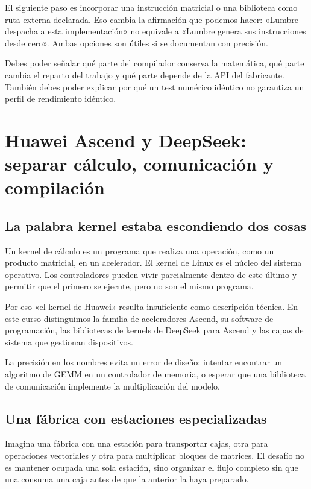 \documentclass[12pt,a4paper,oneside]{report}
\begin{document}
El siguiente paso es incorporar una instrucción matricial o una biblioteca como ruta externa declarada. Eso cambia la afirmación que podemos hacer: «Lumbre despacha a esta implementación» no equivale a «Lumbre genera sus instrucciones desde cero». Ambas opciones son útiles si se documentan con precisión.

\begin{comprueba}
Debes poder señalar qué parte del compilador conserva la matemática, qué parte cambia el reparto del trabajo y qué parte depende de la API del fabricante. También debes poder explicar por qué un test numérico idéntico no garantiza un perfil de rendimiento idéntico.

\end{comprueba}
\chapter{Huawei Ascend y DeepSeek: separar cálculo, comunicación y compilación}
\label{ch:ascend}
\section{La palabra kernel estaba escondiendo dos cosas}
Un kernel de cálculo es un programa que realiza una operación, como un producto matricial, en un acelerador. El kernel de Linux es el núcleo del sistema operativo. Los controladores pueden vivir parcialmente dentro de este último y permitir que el primero se ejecute, pero no son el mismo programa.

Por eso «el kernel de Huawei» resulta insuficiente como descripción técnica. En este curso distinguimos la familia de aceleradores Ascend, su software de programación, las bibliotecas de kernels de DeepSeek para Ascend y las capas de sistema que gestionan dispositivos.

La precisión en los nombres evita un error de diseño: intentar encontrar un algoritmo de GEMM en un controlador de memoria, o esperar que una biblioteca de comunicación implemente la multiplicación del modelo.

\section{Una fábrica con estaciones especializadas}
Imagina una fábrica con una estación para transportar cajas, otra para operaciones vectoriales y otra para multiplicar bloques de matrices. El desafío no es mantener ocupada una sola estación, sino organizar el flujo completo sin que una consuma una caja antes de que la anterior la haya preparado.
\end{document}
